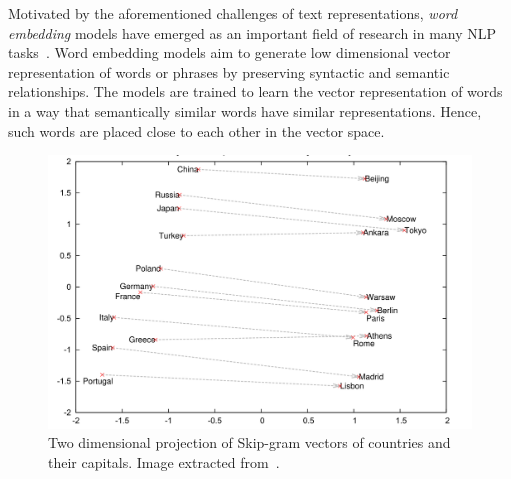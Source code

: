 Motivated by the aforementioned challenges of text representations, \textit{word embedding} models have emerged as an important field of research in many NLP tasks~\cite{survey_word_embeddings}. Word embedding models aim to generate low dimensional vector representation of words or phrases by preserving syntactic and semantic relationships. The models are trained to learn the vector representation of words in a way that semantically similar words have similar representations. Hence, such words are placed %
 close to each other in the vector space. %
\begin{figure}[t]
 \includegraphics[width=\linewidth]{Figures/fig_word_vec_contries_capitals.png}
 \centering
 \caption{Two dimensional projection of Skip-gram vectors of countries and their capitals. Image extracted from~\protect\cite{DBLP:conf/nips/MikolovSCCD13}.}
 \label{fig:countries_capitals}
\end{figure} 

